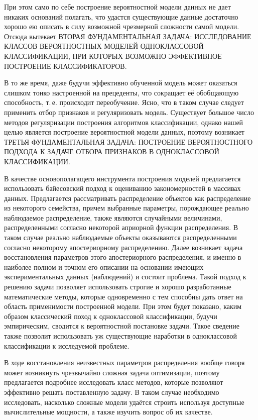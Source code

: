 \documentclass[12pt,a4paper]{article}
\newcommand\nameofpart[1]{\noindent\maintext{#1}\par}
\begin{document}
	При этом само по себе построение вероятностной модели данных не дает никаких оснований полагать, что удастся существующие данные достаточно хорошо ею описать в силу возможной чрезмерной сложности самой модели. 
	Отсюда вытекает \MakeTextUppercase{вторая фундаментальная задача: исследование классов вероятностных моделей одноклассовой классификации, при которых возможно эффективное построение классификаторов.} %

	В то же время, даже будучи эффективно обученной модель может оказаться слишком тонко настроенной на прецеденты, что сокращает её обобщающую способность, т.\,е. происходит переобучение. 
	Ясно, что в таком случае следует применить отбор признаков и регуляризовать модель. 
	Существует большое число методов регуляризации построения алгоритмов классификации, однако нашей целью является построение вероятностной модели данных, поэтому возникает 
	\MakeTextUppercase{третья фундаментальная задача: построение вероятностного подхода к задаче отбора признаков в одноклассовой классификации.}
	
	\nameofpart{Предлагаемые методы и подходы}
	 В качестве основополагащего инструмента построения моделей предлагается использовать байесовский подход к оцениванию закономерностей в массивах данных.
	Предлагается рассматривать распределение объектов как распределение из некоторого семейства, причем выбранные параметры, порождающее реально наблюдаемое распределение, также являются случайными величинами, распределенными согласно некоторой априорной функции распределения. 
	В таком случае реально наблюдаемые объекты оказываются распределенными согласно некоторому апостериорному распределению. 
	Далее возникает задача восстановления параметров этого апостериорного распределения, и именно в наиболее полном и точном его описании на основании имеющих экспериментальных данных (наблюдений) и состоит проблема. 
	Такой подход к решению задачи позволяет использовать строгие и хорошо разработанные математические методы, которые одновременно с тем способны дать ответ на область применимости построенной модели.
	При этом будет показано, каким образом классический поход к одноклассовой классификации, будучи эмпирическим, сводится к вероятностной постановке задачи. 
	Такое сведение также позволит использовать уж существующие наработки в одноклассовой классификации к исследуемой проблеме.

	 В ходе восстановления неизвестных параметров распределения вообще говоря может возникнуть чрезвычайно сложная задача оптимизации, поэтому предлагается подробнее исследовать класс методов, которые позволяют эффективно решать поставленную задачу. 
	В таком случае необходимо исследовать, насколько сложные модели удаётся строить используя доступные вычислительные мощности, а также изучить вопрос об их качестве.
\end{document}
